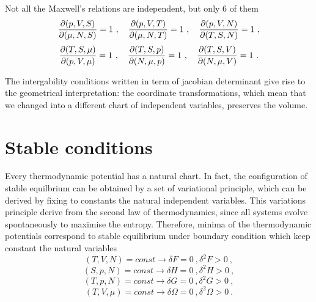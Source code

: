     Not all the Maxwell's relations are independent, but only $6$ of them 
    \begin{equation*}
        \frac{\partial(p, V, S)}{\partial(\mu, N, S)} = 1 ~, \quad \frac{\partial(p, V, T)}{\partial(\mu, N, T)} = 1 ~, \quad \frac{\partial(p, V, N)}{\partial(T, S, N)} = 1 ~, 
    \end{equation*}
    \begin{equation*}
        \frac{\partial(T, S, \mu)}{\partial(p, V, \mu)} = 1 ~, \quad \frac{\partial(T, S, p)}{\partial(N, \mu, p)} = 1 ~, \quad \frac{\partial(T, S, V)}{\partial(N, \mu, V)} = 1 ~.
    \end{equation*}

    The intergability conditions written in term of jacobian determinant give rise to the geometrical interpretation: the coordinate transformations, which mean that we changed into a different chart of independent variables, preserves the volume.

\section{Stable conditions}

    Every thermodynamic potential has a natural chart. In fact, the configuration of stable equilbrium can be obtained by a set of variational principle, which can be derived by fixing to constants the natural independent variables. This variations principle derive from the second law of thermodynamics, since all systems evolve spontaneously to maximise the entropy. Therefore, minima of the thermodynamic potentials correspond to stable equilibrium under boundary condition which keep constant the natural variables
    \begin{equation*}
        (T, V, N) = const \rightarrow \delta F = 0 ~, \delta^2 F > 0 ~, 
    \end{equation*}
    \begin{equation*}
        (S, p, N) = const \rightarrow \delta H = 0 ~, \delta^2 H > 0 ~, 
    \end{equation*}
    \begin{equation*}
        (T, p, N) = const \rightarrow \delta G = 0 ~, \delta^2 G > 0 ~, 
    \end{equation*}
    \begin{equation*}
        (T, V, \mu) = const \rightarrow \delta \Omega = 0 ~, \delta^2 \Omega > 0 ~.
    \end{equation*}

